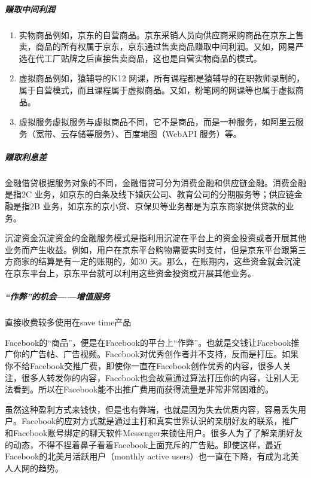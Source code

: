 \documentclass[letterpaper,11pt,english]{sphinxmanual}
\begin{document}
\subparagraph{赚取中间利润}
\label{\detokenize{chapter_introduction/money:id11}}\begin{enumerate}
%
\item {} 
实物商品例如，京东的自营商品。京东采销人员向供应商采购商品在京东上售卖，商品的所有权属于京东，京东通过售卖商品赚取中间利润。又如，网易严选在代工厂贴牌之后直接售卖商品，这也是自营实物商品的模式。

\item {} 
虚拟商品例如，猿辅导的K12
网课，所有课程都是猿辅导的在职教师录制的，属于自营模式，而且课程属于虚拟商品。又如，粉笔网的网课等也属于虚拟商品。

\item {} 
虚拟服务虚拟服务与虚拟商品不同，它不是商品，而是一种服务，如阿里云服务（宽带、云存储等服务）、百度地图（WebAPI
服务）等。

\end{enumerate}


\subparagraph{赚取利息差}
\label{\detokenize{chapter_introduction/money:id12}}
金融借贷根据服务对象的不同，金融借贷可分为消费金融和供应链金融。消费金融是指2C
业务，如京东的白条及线下婚庆公司、教育公司的分期服务等；供应链金融是指2B
业务，如京东的京小贷、京保贝等业务都是为京东商家提供贷款的业务。

沉淀资金沉淀资金的金融服务模式是指利用沉淀在平台上的资金投资或者开展其他业务而产生收益。例如，用户在京东平台购物需要实时支付，但是京东平台跟第三方商家的结算是有一定的账期的，如30
天。那么，在账期内，这些资金就会沉淀在京东平台上，京东平台就可以利用这些资金投资或开展其他业务。


\subparagraph{“作弊”的机会——增值服务}
\label{\detokenize{chapter_introduction/money:id13}}
直接收费较多使用在save time产品

Facebook的“商品”，便是在Facebook的平台上“作弊”。也就是交钱让Facebook推广你的广告帖、广告视频。Facebook对优秀创作者并不支持，反而是打压。如果你不给Facebook交推广费，即使你一直在Facebook创作优秀的内容，很多人关注，很多人转发你的内容，Facebook也会故意通过算法打压你的内容，让别人无法看到。所以在Facebook能不出推广费用而获得流量是非常非常困难的。

虽然这种盈利方式来钱快，但是也有弊端，也就是因为失去优质内容，容易丢失用户。Facebook的应对方式就是通过主打和真实世界认识的亲朋好友的联系，推广和Facebook账号绑定的聊天软件Messenger来锁住用户。很多人为了了解亲朋好友的动态，不得不捏着鼻子看着Facebook上面充斥的广告贴。即使这样，最近Facebook的北美月活跃用户（monthly
active users）也一直在下降，有成为北美人人网的趋势。
\end{document}
